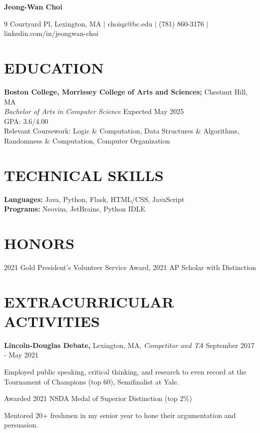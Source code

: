 \documentclass[11pt]{article}
\begin{document}
\begin{center}
\textbf{\LARGE Jeong-Wan Choi}
\end{center}

\begin{center}
9 Courtyard Pl, Lexington, MA $|$ choiqz@bc.edu $|$ (781) 860-3176 $|$ linkedin.com/in/jeongwan-choi 
\end{center}

\section*{EDUCATION}
\textbf{Boston College, Morrissey College of Arts and Sciences;} Chestnut Hill, MA \\
\textit{Bachelor of Arts in Computer Science} \hfill {Expected May 2025} \\
GPA: 3.6/4.00 \\
Relevant Coursework: Logic \& Computation, Data Structures \& Algorithms, Randomness \& Computation, Computer Organization

\section*{TECHNICAL SKILLS}
\textbf{Languages:} Java, Python, Flask, HTML/CSS, JavaScript \\
\textbf{Programs:} Neovim, JetBrains, Python IDLE

\section*{HONORS}
2021 Gold President’s Volunteer Service Award, 2021 AP Scholar with Distinction

\section*{EXTRACURRICULAR ACTIVITIES}
\textbf{Lincoln-Douglas Debate,} Lexington, MA, \textit{Competitor and TA} \hfill September 2017 - May 2021
\begin{sublist}
  \item Employed public speaking, critical thinking, and research to even record at the Tournament of Champions (top 60), Semifinalist at Yale.
  \item Awarded 2021 NSDA Medal of Superior Distinction (top 2\%)
  \item Mentored 20+ freshmen in my senior year to hone their argumentation and persuasion.
\end{sublist}
\end{document}
